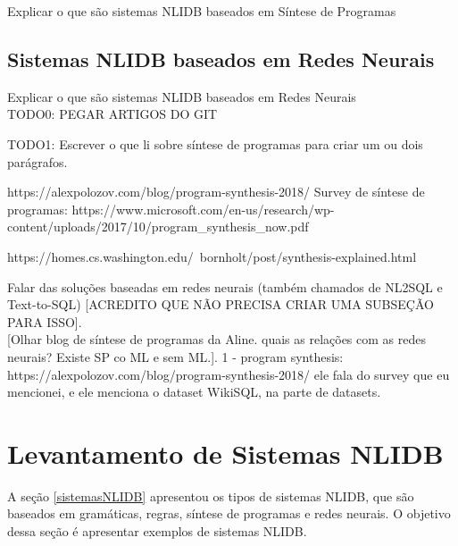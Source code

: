 \documentclass{article}
\begin{document}
Explicar o que são sistemas NLIDB baseados em Síntese de Programas\\

\subsection{Sistemas NLIDB baseados em Redes Neurais}

Explicar o que são sistemas NLIDB baseados em Redes Neurais\\


TODO0: PEGAR ARTIGOS DO GIT

TODO1: Escrever o que li sobre síntese de programas para criar um ou dois parágrafos.

\citep{gulwani2017program}
\citep{yaghmazadeh2017sqlizer}

https://alexpolozov.com/blog/program-synthesis-2018/
Survey de síntese de programas: https://www.microsoft.com/en-us/research/wp-content/uploads/2017/10/program_synthesis_now.pdf

https://homes.cs.washington.edu/~bornholt/post/synthesis-explained.html








Falar das soluções baseadas em redes neurais (também chamados de NL2SQL e Text-to-SQL) [ACREDITO QUE NÃO PRECISA CRIAR UMA SUBSEÇÃO PARA ISSO].\\

[Olhar blog de síntese de programas da Aline. quais as relações com as redes neurais? Existe SP co ML e sem ML.]. 1 - program synthesis: https://alexpolozov.com/blog/program-synthesis-2018/ ele fala do survey que eu mencionei, e ele menciona o dataset WikiSQL, na parte de datasets.




\section{Levantamento de Sistemas NLIDB\label{exemplosSistemasNLIDB}}

A seção \ref{sistemasNLIDB} apresentou os tipos de sistemas NLIDB, que são baseados em gramáticas, regras, síntese de programas e redes neurais. O objetivo dessa seção é apresentar exemplos de sistemas NLIDB.\\
\end{document}
